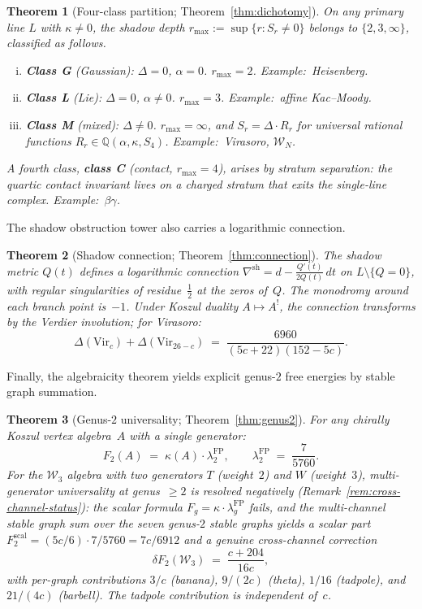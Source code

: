 \documentclass[11pt]{article}
\theoremstyle{plain}
\newtheorem{theorem}{Theorem}[section]
\theoremstyle{definition}
\theoremstyle{remark}
\newcommand{\cW}{\mathcal{W}}
\begin{document}
\begin{theorem}[Four-class partition; Theorem~\ref{thm:dichotomy}]
\label{thm:intro-classification}
On any primary line $L$ with $\kappa \neq 0$, the shadow
depth $r_{\max} := \sup\{r : S_r \neq 0\}$ belongs to
$\{2, 3, \infty\}$, classified as follows.
\begin{enumerate}[(i)]
\item \textbf{Class G} (Gaussian):
 $\Delta = 0$, $\alpha = 0$.
 $r_{\max} = 2$. Example:\ Heisenberg.
\item \textbf{Class L} (Lie):
 $\Delta = 0$, $\alpha \neq 0$.
 $r_{\max} = 3$. Example:\ affine Kac--Moody.
\item \textbf{Class M} (mixed):
 $\Delta \neq 0$.
 $r_{\max} = \infty$, and $S_r = \Delta \cdot R_r$ for
 universal rational functions
 $R_r \in \mathbb{Q}(\alpha, \kappa, S_4)$.
 Example:\ Virasoro, $\cW_N$.
\end{enumerate}
A fourth class, \textbf{class C} (contact, $r_{\max} = 4$),
arises by stratum separation: the quartic contact invariant
lives on a charged stratum that exits the single-line complex.
Example:\ $\beta\gamma$.
\end{theorem}

The shadow obstruction tower also carries a logarithmic connection.

\begin{theorem}[Shadow connection; Theorem~\ref{thm:connection}]
\label{thm:intro-connection}
The shadow metric $Q(t)$ defines a logarithmic connection
$\nabla^{\mathrm{sh}} = d - \frac{Q'(t)}{2Q(t)}\,dt$
on $L \setminus \{Q = 0\}$, with regular singularities
of residue~$\tfrac{1}{2}$ at the zeros of~$Q$.
The monodromy around each branch point is~$-1$.
Under Koszul duality $A \mapsto A^{!}$, the connection transforms
by the Verdier involution; for Virasoro:
\[
 \Delta(\mathrm{Vir}_c)
 + \Delta(\mathrm{Vir}_{26-c})
 \;=\; \frac{6960}{(5c+22)(152-5c)}.
\]
\end{theorem}

Finally, the algebraicity theorem yields explicit genus-$2$
free energies by stable graph summation.

\begin{theorem}[Genus-$2$ universality; Theorem~\ref{thm:genus2}]
\label{thm:intro-genus2}
For any chirally Koszul vertex algebra~$A$ with a single
generator:
\[
 F_2(A) \;=\; \kappa(A) \cdot \lambda_2^{\mathrm{FP}},
 \qquad
 \lambda_2^{\mathrm{FP}} \;=\; \frac{7}{5760}.
\]
For the $\cW_3$ algebra with two generators
$T$ (weight~$2$) and $W$ (weight~$3$),
multi-generator universality at genus~$\geq 2$ is
resolved negatively
\textup{(}Remark~\textup{\ref{rem:cross-channel-status})}:
the scalar formula $F_g = \kappa \cdot \lambda_g^{\mathrm{FP}}$
\emph{fails}, and the multi-channel
stable graph sum over the seven genus-$2$ stable graphs
yields a scalar part
$F_2^{\mathrm{scal}} = (5c/6) \cdot 7/5760 = 7c/6912$
and a genuine cross-channel correction
\[
 \delta F_2(\cW_3) \;=\;
 \frac{c + 204}{16c},
\]
with per-graph contributions $3/c$ \textup{(}banana\textup{)},
$9/(2c)$ \textup{(}theta\textup{)},
$1/16$ \textup{(}tadpole\textup{)}, and
$21/(4c)$ \textup{(}barbell\textup{)}.
The tadpole contribution is independent of~$c$.
\end{theorem}
\end{document}
